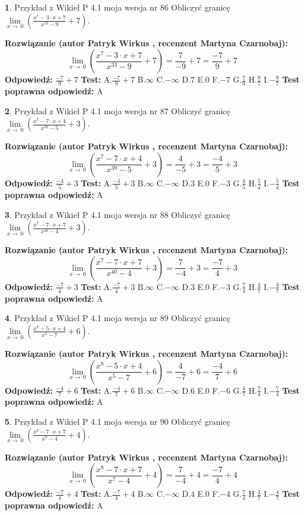 \documentclass[12pt, a4paper]{article}
\theoremstyle{definition} %
\newtheorem{zad}{}
\newcommand{\zadStart}[1]{\begin{zad}#1\newline}
\newcommand{\zadStop}{\end{zad}}
\newcommand{\rozwStart}[2]{\noindent \textbf{Rozwiązanie (autor #1 , recenzent #2): }\newline}
\newcommand{\rozwStop}{\newline}
\newcommand{\odpStart}{\noindent \textbf{Odpowiedź:}\newline}
\newcommand{\odpStop}{\newline}
\newcommand{\testStart}{\noindent \textbf{Test:}\newline}
\newcommand{\testStop}{\newline}
\newcommand{\kluczStart}{\noindent \textbf{Test poprawna odpowiedź:}\newline}
\newcommand{\kluczStop}{\newline}
\begin{document}
\zadStart{Przykład z Wikieł P 4.1 moja wersja nr 86}
Obliczyć granicę $\lim\limits_{x\to\ 0}(\frac{x^{7}-3 \cdot x +7}{x^{33}-9}+7)$.
\zadStop
\rozwStart{Patryk Wirkus}{Martyna Czarnobaj}
$$\lim\limits_{x\to\ 0}(\frac{x^{7}-3 \cdot x +7}{x^{33}-9}+7)=\frac{7}{-9}+7=\frac{-7}{9}+7$$
\rozwStop
\odpStart
$\frac{-7}{9}+7$
\odpStop
\testStart
A.$\frac{-7}{9}+7$
B.$\infty$
C.$-\infty$
D.$7$
E.$0$
F.$-7$
G.$\frac{7}{9}$
H.$\frac{9}{7}$
I.$-\frac{9}{7}$
\testStop
\kluczStart
A
\kluczStop



\zadStart{Przykład z Wikieł P 4.1 moja wersja nr 87}
Obliczyć granicę $\lim\limits_{x\to\ 0}(\frac{x^{7}-7 \cdot x +4}{x^{39}-5}+3)$.
\zadStop
\rozwStart{Patryk Wirkus}{Martyna Czarnobaj}
$$\lim\limits_{x\to\ 0}(\frac{x^{7}-7 \cdot x +4}{x^{39}-5}+3)=\frac{4}{-5}+3=\frac{-4}{5}+3$$
\rozwStop
\odpStart
$\frac{-4}{5}+3$
\odpStop
\testStart
A.$\frac{-4}{5}+3$
B.$\infty$
C.$-\infty$
D.$3$
E.$0$
F.$-3$
G.$\frac{4}{5}$
H.$\frac{5}{4}$
I.$-\frac{5}{4}$
\testStop
\kluczStart
A
\kluczStop



\zadStart{Przykład z Wikieł P 4.1 moja wersja nr 88}
Obliczyć granicę $\lim\limits_{x\to\ 0}(\frac{x^{7}-7 \cdot x +7}{x^{40}-4}+3)$.
\zadStop
\rozwStart{Patryk Wirkus}{Martyna Czarnobaj}
$$\lim\limits_{x\to\ 0}(\frac{x^{7}-7 \cdot x +7}{x^{40}-4}+3)=\frac{7}{-4}+3=\frac{-7}{4}+3$$
\rozwStop
\odpStart
$\frac{-7}{4}+3$
\odpStop
\testStart
A.$\frac{-7}{4}+3$
B.$\infty$
C.$-\infty$
D.$3$
E.$0$
F.$-3$
G.$\frac{7}{4}$
H.$\frac{4}{7}$
I.$-\frac{4}{7}$
\testStop
\kluczStart
A
\kluczStop



\zadStart{Przykład z Wikieł P 4.1 moja wersja nr 89}
Obliczyć granicę $\lim\limits_{x\to\ 0}(\frac{x^{8}-5 \cdot x +4}{x^{5}-7}+6)$.
\zadStop
\rozwStart{Patryk Wirkus}{Martyna Czarnobaj}
$$\lim\limits_{x\to\ 0}(\frac{x^{8}-5 \cdot x +4}{x^{5}-7}+6)=\frac{4}{-7}+6=\frac{-4}{7}+6$$
\rozwStop
\odpStart
$\frac{-4}{7}+6$
\odpStop
\testStart
A.$\frac{-4}{7}+6$
B.$\infty$
C.$-\infty$
D.$6$
E.$0$
F.$-6$
G.$\frac{4}{7}$
H.$\frac{7}{4}$
I.$-\frac{7}{4}$
\testStop
\kluczStart
A
\kluczStop



\zadStart{Przykład z Wikieł P 4.1 moja wersja nr 90}
Obliczyć granicę $\lim\limits_{x\to\ 0}(\frac{x^{8}-7 \cdot x +7}{x^{7}-4}+4)$.
\zadStop
\rozwStart{Patryk Wirkus}{Martyna Czarnobaj}
$$\lim\limits_{x\to\ 0}(\frac{x^{8}-7 \cdot x +7}{x^{7}-4}+4)=\frac{7}{-4}+4=\frac{-7}{4}+4$$
\rozwStop
\odpStart
$\frac{-7}{4}+4$
\odpStop
\testStart
A.$\frac{-7}{4}+4$
B.$\infty$
C.$-\infty$
D.$4$
E.$0$
F.$-4$
G.$\frac{7}{4}$
H.$\frac{4}{7}$
I.$-\frac{4}{7}$
\testStop
\kluczStart
A
\kluczStop
\end{document}
